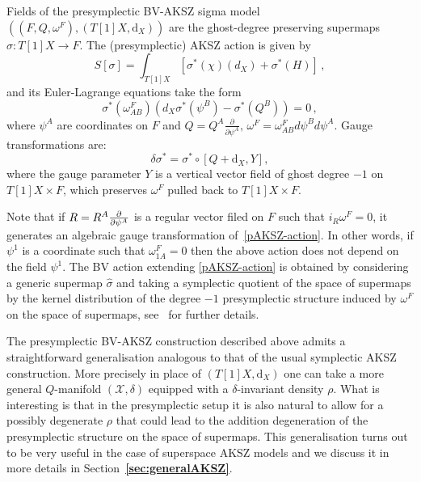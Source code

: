 \documentclass[a4paper,12pt]{article}
\numberwithin{equation}{section} %
\renewcommand{\hat}{\widehat}
\newcommand{\bref}[1]{\textbf{\ref{#1}}}
\newcommand{\dx}{\mathrm{d}_X}
\renewcommand{\d}{\partial}
\newcommand{\ffrac}[2]{\raisebox{.5pt}%
  {\footnotesize$\displaystyle\frac{#1}{#2}$}\kern1pt}
\newcommand{\dl}[1]{\mathchoice{\ffrac{\d}{\d #1}}{\frac{\d}{\d #1}}{\ffrac{\d}{\d #1}}{\ffrac{\d}{\d #1}}}
\newcommand{\manifold}[1]{\mathscr{#1}}
\newcommand{\manX}{\manifold{X}}
\numberwithin{equation}{section}
\begin{document}
Fields of the presymplectic BV-AKSZ sigma model $((F,Q,\omega^F),(T[1]X,\dx))$   are the 
ghost-degree preserving supermaps $\sigma: T[1]X \to F$. The (presymplectic) AKSZ action is given by 
\begin{equation}
\label{pAKSZ-action}
    S[\sigma] = \int_{T[1]X}  \left[ \sigma^\ast(\chi)(d_X) + \sigma^\ast(H)\right]\,,
\end{equation}
and its Euler-Lagrange equations take the form
\begin{equation}\label{pAKSZ-eq}
    \sigma^\ast(\omega^F_{AB})\left(d_X\sigma^\ast(\psi^B) - \sigma^\ast(Q^B)\right) = 0\,,
\end{equation}
where $\psi^A$ are coordinates on $F$ and $Q = Q^A\frac{\partial}{\partial \psi^A}, \,\omega^F = \omega^F_{AB}d\psi^Bd\psi^A$. Gauge transformations are:
\begin{equation}\label{pAKSZ-gauge-sym}
    \delta \sigma^\ast = \sigma^\ast \circ [Q+\dx,Y],
\end{equation}
where the gauge parameter $Y$ is a vertical vector field of ghost degree $-1$ on $T[1]X \times F$, which preserves $\omega^F$ pulled back to $T[1]X \times F$. 

Note that if $R=R^A\dl{\psi^A}$ is a regular vector filed on $F$ such that $i_R\omega^F=0$, it generates an algebraic gauge transformation of~\eqref{pAKSZ-action}. In other words, if $\psi^1$ is a coordinate such that $\omega^F_{1A}=0$ then the above action does not depend on the field $\psi^1$.  The BV action extending \eqref{pAKSZ-action} is obtained by considering a generic supermap $\hat\sigma$ and taking a symplectic quotient of the space of supermaps by the kernel distribution of the degree $-1$ presymplectic structure induced by $\omega^F$ on the space of supermaps, see~\cite{Grigoriev:2020xec,Dneprov:2022jyn,Grigoriev:2022zlq,Dneprov:2024cvt} for further details.

The presymplectic BV-AKSZ construction described above admits a straightforward generalisation analogous to that of the usual symplectic AKSZ construction. More precisely in place of $(T[1]X,\dx)$ one can take a more general $Q$-manifold $(\manX,\delta)$ equipped with a $\delta$-invariant density $\rho$. What is interesting is that in the presymplectic setup it is also natural to allow for a possibly degenerate $\rho$ that could lead
to the addition degeneration of the presymplectic structure on the space of supermaps. 
This generalisation turns out to be very useful in the case of superspace AKSZ  models and we discuss it in more details in Section~\bref{sec:generalAKSZ}.
\end{document}
